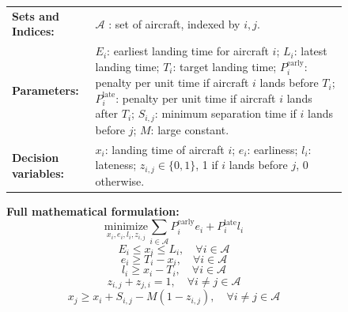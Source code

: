 \documentclass[review,12pt]{elsarticle}
\begin{document}
\begin{figure}[htbp]
{{\begin{tcolorbox}
\begin{tcolorbox}[
    width=\linewidth,
    colframe=form, 
    colback=form!6, 
    title={\textbf{Formulation}}, 
    fonttitle=\bfseries,
    halign title=center,
    boxrule=0.6pt,
    arc=2pt,
    left=1mm, right=1mm, top=0.5mm, bottom=0.5mm,
    before skip=0mm, after skip=0.5mm
]
\setlength{\abovedisplayskip}{1pt}
\setlength{\belowdisplayskip}{1pt}

\noindent\setlength{\tabcolsep}{0pt}
\setlength{\parindent}{0pt}
\renewcommand{\arraystretch}{0.9}
\vspace{-6mm}
\begin{tabularx}{\linewidth}{@{}lX@{}}
\textbf{Sets and Indices:} & $\mathcal{A}$ : set of aircraft, indexed by $i, j$.\\
\textbf{Parameters:} &
$E_i$: earliest landing time for aircraft $i$; 
$L_i$: latest landing time; 
$T_i$: target landing time; 
$P_i^{\text{early}}$: penalty per unit time if aircraft $i$ lands before $T_i$; 
$P_i^{\text{late}}$: penalty per unit time if aircraft $i$ lands after $T_i$; 
$S_{i,j}$: minimum separation time if $i$ lands before $j$; 
$M$: large constant.\\
\textbf{Decision variables:} &
$x_i$: landing time of aircraft $i$; 
$e_i$: earliness; 
$l_i$: lateness; 
$z_{i,j} \in \{0,1\}$, 1 if $i$ lands before $j$, 0 otherwise.\\
\end{tabularx}
\vspace{-7mm}
\textbf{Full mathematical formulation:}
\vspace{-4mm}
\begin{equation}
\underset{x_i, e_i, l_i, z_{i,j}}{\text{minimize}}
\sum_{i \in \mathcal{A}} P_i^{\text{early}} e_i + P_i^{\text{late}} l_i
\end{equation}
\vspace{-4mm}
\begin{equation}
E_i \leq x_i \leq L_i, \quad \forall i \in \mathcal{A}
\end{equation}
\vspace{-7mm}
\begin{equation}
e_i \geq T_i - x_i, \quad \forall i \in \mathcal{A}
\end{equation}
\vspace{-7mm}
\begin{equation}
l_i \geq x_i - T_i, \quad \forall i \in \mathcal{A}
\end{equation}
\vspace{-7mm}
\begin{equation}
z_{i,j} + z_{j,i} = 1, \quad \forall i \neq j \in \mathcal{A}
\end{equation}
\vspace{-7mm}
\begin{equation}
x_j \geq x_i + S_{i,j} - M(1 - z_{i,j}), \quad \forall i \neq j \in \mathcal{A}
\end{equation}
\end{tcolorbox}


\end{tcolorbox}}}
\end{figure}
\end{document}
